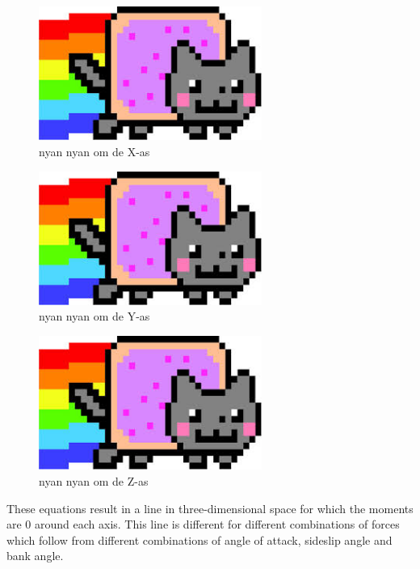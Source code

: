 \begin{figure}[h]
	\centering
	\includegraphics[width=0.65\textwidth]{./Figure/Nyan}
	\caption{nyan nyan om de X-as}
	\label{fig:momx}
\end{figure}
\begin{figure}[h]
	\centering
	\includegraphics[width=0.65\textwidth]{./Figure/Nyan}
	\caption{nyan nyan om de Y-as}
	\label{fig:momy}
\end{figure}
\begin{figure}[h]
	\centering
	\includegraphics[width=0.65\textwidth]{./Figure/Nyan}
	\caption{nyan nyan om de Z-as}
	\label{fig:momz}
\end{figure}

These equations result in a line in three-dimensional space for which the moments are 0 around each axis. This line is different for different combinations of forces which follow from different combinations of angle of attack, sideslip angle and bank angle.

